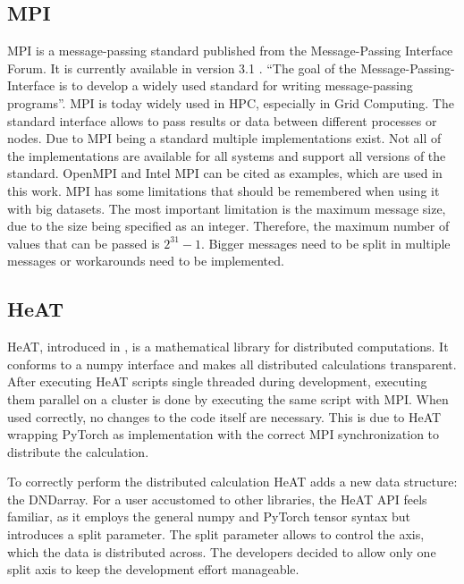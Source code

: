 \subsection{MPI}
\label{subec:mpi}
\gls{MPI} is a message-passing standard published from the Message-Passing Interface Forum. It is currently available in version 3.1 \cite{message_passing_interface_forum_mpi_2015}.
\enquote{The goal of the Message-Passing-Interface \textelp{} is to develop a widely used standard for writing message-passing programs}\cite{message_passing_interface_forum_mpi_2015}.
\gls{MPI} is today widely used in \gls{HPC}, especially in Grid Computing. The standard interface allows to pass results or data between different processes or nodes.
Due to \gls{MPI} being a standard multiple implementations exist. Not all of the implementations are available for all systems and support all versions of the standard.
OpenMPI \cite{noauthor_open_nodate} and Intel MPI \cite{noauthor_intel_nodate} can be cited as examples, which are used in this work.
\gls{MPI} has some limitations that should be remembered when using it with big datasets. The most important limitation is the maximum message size, due to the size
being specified as an integer. Therefore, the maximum number of values that can be passed is \(2^{31} - 1\). Bigger messages need to be split in multiple messages or workarounds need to be implemented.

\subsection{HeAT}
\label{subsec:heat}
\gls{HeAT}, introduced in \cite{krajsek_helmholtz_nodate}, is a mathematical library for distributed computations.
It conforms to a \gls{numpy} \cite{noauthor_numpy_nodate} interface and makes all distributed calculations transparent.
After executing \gls{HeAT} scripts single threaded during development, executing them parallel on a cluster is done by executing the same script with \gls{MPI}.
When used correctly, no changes to the code itself are necessary.
This is due to \gls{HeAT} wrapping \gls{PyTorch} as implementation with the correct \gls{MPI} synchronization to distribute the calculation.

To correctly perform the distributed calculation \gls{HeAT} adds a new data structure: the \gls{DNDarray}.
For a user accustomed to other libraries, the \gls{HeAT} API feels familiar, as it employs the general \gls{numpy} and \gls{PyTorch} tensor syntax
but introduces a split parameter.
The split parameter allows to control the axis, which the data is distributed across.
The developers decided to allow only one split axis to keep the development effort manageable.

